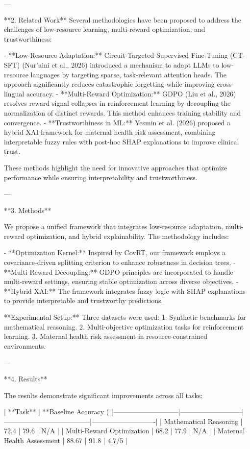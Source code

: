 ---

**2. Related Work**  
Several methodologies have been proposed to address the challenges of low-resource learning, multi-reward optimization, and trustworthiness:  

- **Low-Resource Adaptation:** Circuit-Targeted Supervised Fine-Tuning (CT-SFT) (Nur’aini et al., 2026) introduced a mechanism to adapt LLMs to low-resource languages by targeting sparse, task-relevant attention heads. The approach significantly reduces catastrophic forgetting while improving cross-lingual accuracy.  
- **Multi-Reward Optimization:** GDPO (Liu et al., 2026) resolves reward signal collapses in reinforcement learning by decoupling the normalization of distinct rewards. This method enhances training stability and convergence.  
- **Trustworthiness in ML:** Yesmin et al. (2026) proposed a hybrid XAI framework for maternal health risk assessment, combining interpretable fuzzy rules with post-hoc SHAP explanations to improve clinical trust.  

These methods highlight the need for innovative approaches that optimize performance while ensuring interpretability and trustworthiness.

---

**3. Methods**  

We propose a unified framework that integrates low-resource adaptation, multi-reward optimization, and hybrid explainability. The methodology includes:  

- **Optimization Kernel:** Inspired by CovRT, our framework employs a covariance-driven splitting criterion to enhance robustness in decision trees.  
- **Multi-Reward Decoupling:** GDPO principles are incorporated to handle multi-reward settings, ensuring stable optimization across diverse objectives.  
- **Hybrid XAI:** The framework integrates fuzzy logic with SHAP explanations to provide interpretable and trustworthy predictions.  

**Experimental Setup:**  
Three datasets were used:  
1. Synthetic benchmarks for mathematical reasoning.
2. Multi-objective optimization tasks for reinforcement learning.  
3. Maternal health risk assessment in resource-constrained environments.  

---

**4. Results**  

The results demonstrate significant improvements across all tasks:  

| **Task**                    | **Baseline Accuracy (%
|-----------------------------|---------------------------|--------------------------------------|----------------------------|  
| Mathematical Reasoning      | 72.4                     | 79.6                                | N/A                        |  
| Multi-Reward Optimization   | 68.2                     | 77.9                                | N/A                        |  
| Maternal Health Assessment  | 88.67                   | 91.8                                | 4.7/5                      |  

